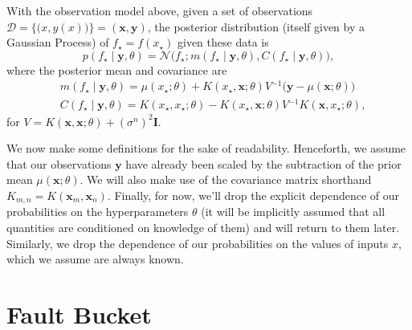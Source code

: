 \documentclass[letterpaper]{article}
\newcommand{\deq}{=}
\newcommand{\given}{\!\ensuremath{\mid}\!}
\newcommand{\cm}[1]{\ensuremath{\mathcal{#1}}}
\newcommand{\bm}[1]{\ensuremath{\mathbf{#1}}}
\newcommand{\data}{\ensuremath{\cm{D}}}
\newcommand{\inv}{\ensuremath{^{-1}}}
\newcommand{\vect}[1]{\bm{#1}}
\newcommand{\vy}{\vect{y}}
\newcommand{\vx}{\vect{x}}
\newcommand{\mean}[2]{{m}(#1\given#2)}
\newcommand{\cov}[2]{{C}(#1\given#2)}
\newcommand{\st}{_{\star}}
\begin{document}
With the observation model above, given a set of observations
$
 \data
 \deq
 \bigl\lbrace
   \bigl( x, y(x) \bigr)
 \bigr\rbrace
 \deq
 ( \bm{x}, \bm{y} )
$,
the posterior distribution (itself given by a Gaussian Process) of $f\st \deq f(x\st)$ given these data is
\begin{equation}\label{eq:GP_posterior}
 p(f\st \given \vy, \theta)
 =
 \cm{N}
 \bigl(
   f\st;
   \mean{f\st}{\vy,\theta},
   \cov{f\st}{\vy,\theta}
 \bigr),
\end{equation}
where the posterior mean and covariance are
\begin{align*}
 &
 \mean{f\st}{\vy,\theta}
 \deq
 \mu(x\st; \theta)
 +
 K(x\st, \bm{x}; \theta)
V \inv
 \bigl(
   \bm{y} - \mu(\bm{x}; \theta)
 \bigr)
 \\  
 &
 \cov{f\st}{\vy,\theta}
 \deq
 K(x\st, x\st; \theta)
 -
 K(x\st, \bm{x}; \theta)
 V\inv
 K(\bm{x}, x\st; \theta),
\end{align*}
for $ V \deq 
 K(\bm{x}, \bm{x}; \theta) + (\sigma^n)^2 \bm{I}
 $.

We now make some definitions for the sake of readability. Henceforth,
we assume that our observations $\vy$ have already been scaled by the
subtraction of the prior mean $\mu(\bm{x}; \theta)$. We will also make
use of the covariance matrix shorthand $K_{m,n} \deq
K(\vx_m,\vx_n)$. Finally, for now, we'll drop the explicit dependence
of our probabilities on the hyperparameters $\theta$ (it will be
implicitly assumed that all quantities are conditioned on knowledge of
them) and will return to them later. Similarly, we drop the dependence of our probabilities on the values of inputs $x$, which we assume are always known.

\section{Fault Bucket}\label{bucket}
\end{document}
